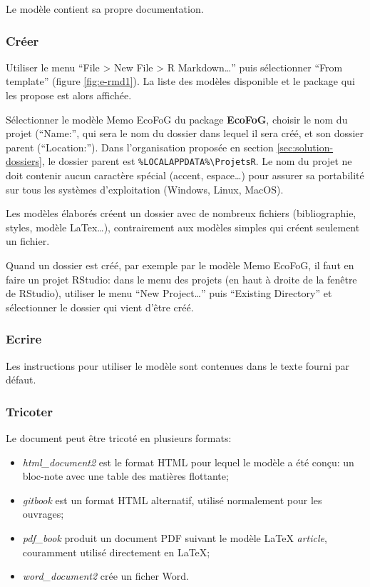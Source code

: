 \documentclass[
  11pt,
  french,
  a4paper,
  extrafontsizes,onecolumn,openright
  ]{memoir}
\providecommand{\tightlist}{%
  \setlength{\itemsep}{0pt}\setlength{\parskip}{0pt}}
\begin{document}
Le modèle contient sa propre documentation.

\hypertarget{cruxe9er}{%
\subsubsection{Créer}\label{cruxe9er}}

Utiliser le menu ``File \textgreater{} New File \textgreater{} R Markdown\ldots{}'' puis sélectionner ``From template'' (figure \ref{fig:e-rmd1}).
La liste des modèles disponible et le package qui les propose est alors affichée.

Sélectionner le modèle Memo EcoFoG du package \textbf{EcoFoG}, choisir le nom du projet (``Name:'', qui sera le nom du dossier dans lequel il sera créé, et son dossier parent (``Location:'').
Dans l'organisation proposée en section \ref{sec:solution-dossiers}, le dossier parent est \texttt{\%LOCALAPPDATA\%\textbackslash{}ProjetsR}.
Le nom du projet ne doit contenir aucun caractère spécial (accent, espace\ldots) pour assurer sa portabilité sur tous les systèmes d'exploitation (Windows, Linux, MacOS).

Les modèles élaborés créent un dossier avec de nombreux fichiers (bibliographie, styles, modèle LaTex\ldots), contrairement aux modèles simples qui créent seulement un fichier.

Quand un dossier est créé, par exemple par le modèle Memo EcoFoG, il faut en faire un projet RStudio: dans le menu des projets (en haut à droite de la fenêtre de RStudio), utiliser le menu ``New Project\ldots{}'' puis ``Existing Directory'' et sélectionner le dossier qui vient d'être créé.

\hypertarget{ecrire}{%
\subsubsection{Ecrire}\label{ecrire}}

Les instructions pour utiliser le modèle sont contenues dans le texte fourni par défaut.

\hypertarget{tricoter}{%
\subsubsection{Tricoter}\label{tricoter}}

Le document peut être tricoté en plusieurs formats:

\begin{itemize}
\tightlist
\item
  \emph{html\_document2} est le format HTML pour lequel le modèle a été conçu: un bloc-note avec une table des matières flottante;
\item
  \emph{gitbook} est un format HTML alternatif, utilisé normalement pour les ouvrages;
\item
  \emph{pdf\_book} produit un document PDF suivant le modèle LaTeX \emph{article}, couramment utilisé directement en LaTeX;
\item
  \emph{word\_document2} crée un ficher Word.
\end{itemize}
\end{document}
